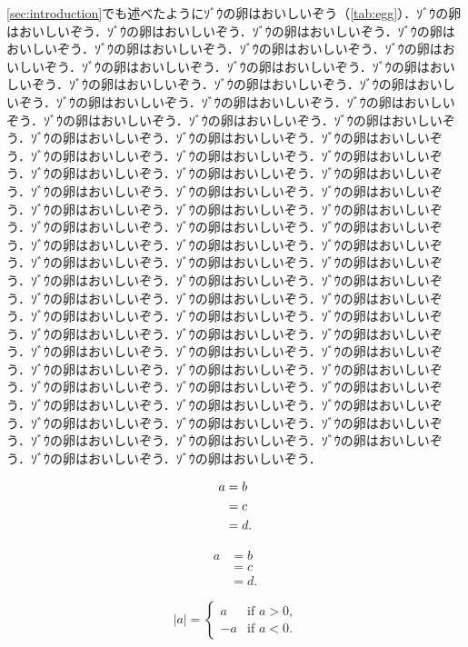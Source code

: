 \documentclass[
	10pt,
	a4j,		%
	twocolumn,	%
	uplatex
]{jsarticle}
\renewcommand{\ref}{\cref}
\begin{document}
\ref{sec:introduction}でも述べたようにｿﾞｳの卵はおいしいぞう（\ref{tab:egg}）．ｿﾞｳの卵はおいしいぞう．ｿﾞｳの卵はおいしいぞう．ｿﾞｳの卵はおいしいぞう．ｿﾞｳの卵はおいしいぞう．ｿﾞｳの卵はおいしいぞう．ｿﾞｳの卵はおいしいぞう．ｿﾞｳの卵はおいしいぞう．ｿﾞｳの卵はおいしいぞう．ｿﾞｳの卵はおいしいぞう．ｿﾞｳの卵はおいしいぞう．ｿﾞｳの卵はおいしいぞう．ｿﾞｳの卵はおいしいぞう．ｿﾞｳの卵はおいしいぞう．ｿﾞｳの卵はおいしいぞう．ｿﾞｳの卵はおいしいぞう．ｿﾞｳの卵はおいしいぞう．ｿﾞｳの卵はおいしいぞう．ｿﾞｳの卵はおいしいぞう．ｿﾞｳの卵はおいしいぞう．ｿﾞｳの卵はおいしいぞう．ｿﾞｳの卵はおいしいぞう．ｿﾞｳの卵はおいしいぞう．ｿﾞｳの卵はおいしいぞう．ｿﾞｳの卵はおいしいぞう．ｿﾞｳの卵はおいしいぞう．ｿﾞｳの卵はおいしいぞう．ｿﾞｳの卵はおいしいぞう．ｿﾞｳの卵はおいしいぞう．ｿﾞｳの卵はおいしいぞう．ｿﾞｳの卵はおいしいぞう．ｿﾞｳの卵はおいしいぞう．ｿﾞｳの卵はおいしいぞう．ｿﾞｳの卵はおいしいぞう．ｿﾞｳの卵はおいしいぞう．ｿﾞｳの卵はおいしいぞう．ｿﾞｳの卵はおいしいぞう．ｿﾞｳの卵はおいしいぞう．ｿﾞｳの卵はおいしいぞう．ｿﾞｳの卵はおいしいぞう．ｿﾞｳの卵はおいしいぞう．ｿﾞｳの卵はおいしいぞう．ｿﾞｳの卵はおいしいぞう．ｿﾞｳの卵はおいしいぞう．ｿﾞｳの卵はおいしいぞう．ｿﾞｳの卵はおいしいぞう．ｿﾞｳの卵はおいしいぞう．ｿﾞｳの卵はおいしいぞう．ｿﾞｳの卵はおいしいぞう．ｿﾞｳの卵はおいしいぞう．ｿﾞｳの卵はおいしいぞう．ｿﾞｳの卵はおいしいぞう．ｿﾞｳの卵はおいしいぞう．ｿﾞｳの卵はおいしいぞう．ｿﾞｳの卵はおいしいぞう．ｿﾞｳの卵はおいしいぞう．ｿﾞｳの卵はおいしいぞう．ｿﾞｳの卵はおいしいぞう．ｿﾞｳの卵はおいしいぞう．ｿﾞｳの卵はおいしいぞう．ｿﾞｳの卵はおいしいぞう．ｿﾞｳの卵はおいしいぞう．ｿﾞｳの卵はおいしいぞう．ｿﾞｳの卵はおいしいぞう．ｿﾞｳの卵はおいしいぞう．ｿﾞｳの卵はおいしいぞう．ｿﾞｳの卵はおいしいぞう．ｿﾞｳの卵はおいしいぞう．ｿﾞｳの卵はおいしいぞう．ｿﾞｳの卵はおいしいぞう．ｿﾞｳの卵はおいしいぞう．ｿﾞｳの卵はおいしいぞう．ｿﾞｳの卵はおいしいぞう．ｿﾞｳの卵はおいしいぞう．ｿﾞｳの卵はおいしいぞう．ｿﾞｳの卵はおいしいぞう．

\begin{align}
a &= b	\\
&= c	\notag\\
&= d.
\end{align}

\begin{equation}
\begin{aligned}
a &= b	\\
&= c	\\
&= d.
\end{aligned}
\label{eq:equation}
\end{equation}

\begin{equation}
|a| =
\begin{cases}
a  & \text{if $a>0$,}\\
-a & \text{if $a<0$.}
\end{cases}
\end{equation}
\end{document}
